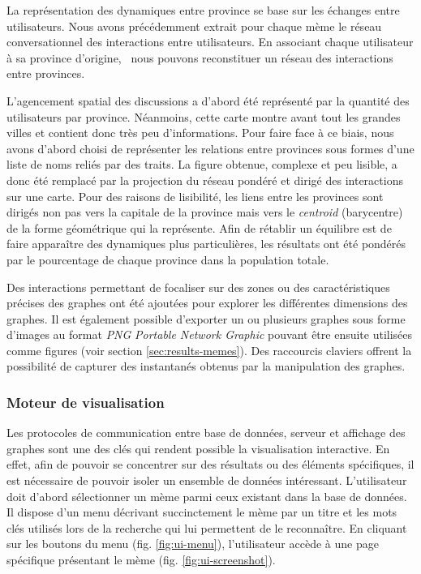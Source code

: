     La représentation des dynamiques entre province se base sur les échanges entre utilisateurs. Nous avons précédemment extrait pour chaque mème le réseau conversationnel des interactions entre utilisateurs. En associant chaque utilisateur à sa province d{\textquoteright}origine, \ nous pouvons reconstituer un réseau des interactions entre provinces. 

    L'agencement spatial des discussions a d'abord été représenté par la quantité des utilisateurs par province. Néanmoins, cette carte montre avant tout les grandes villes et contient donc très peu d'informations. Pour faire face à ce biais, nous avons d'abord choisi de représenter les relations entre provinces sous formes d'une liste de noms reliés par des traits. La figure obtenue, complexe et peu lisible, a donc été remplacé par la projection du réseau pondéré et dirigé des interactions sur une carte. Pour des raisons de lisibilité, les liens entre les provinces sont dirigés non pas vers la capitale de la province mais vers le \textit{centroid} (barycentre) de la forme géométrique qui la représente. Afin de rétablir un équilibre est de faire appara\^itre des dynamiques plus particuli\`eres, les résultats ont été pondérés par le pourcentage de chaque province dans la population totale.

    Des interactions permettant de focaliser sur des zones ou des caractéristiques précises des graphes ont été ajoutées pour explorer les différentes dimensions des graphes. Il est également possible d'exporter un ou plusieurs graphes sous forme d'images au format \textit{PNG} \textit{Portable Network Graphic} pouvant être ensuite utilisées comme figures (voir section \ref{sec:results-memes}). Des raccourcis claviers offrent la possibilité de capturer des instantanés obtenus par la manipulation des graphes.
    
\subsubsection{Moteur de visualisation} 
\label{sec:moteur_de_visualisation}

    Les protocoles de communication entre base de données, serveur et affichage des graphes sont une des clés qui rendent possible la visualisation interactive. En effet, afin de pouvoir se concentrer sur des résultats ou des éléments spécifiques, il est nécessaire de pouvoir isoler un ensemble de données intéressant. L'utilisateur doit d'abord sélectionner un mème parmi ceux existant dans la base de données. Il dispose d'un menu décrivant succinctement le mème par un titre et les mots clés utilisés lors de la recherche qui lui permettent de le reconnaître. En cliquant sur les boutons du menu (fig. \ref{fig:ui-menu}), l'utilisateur accède à une page spécifique présentant le mème (fig. \ref{fig:ui-screenshot}).


